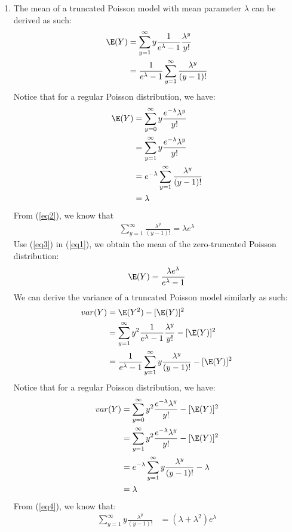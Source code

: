 \begin{enumerate}
\item
The mean of a truncated Poisson model with mean parameter $\lambda$ can be derived as such:
\begin{align}
\E(Y) & = \sum_{y = 1}^{\infty} y\frac{1}{e^\lambda - 1}\frac{\lambda^y}{y!} \nonumber \\
& = \frac{1}{e^\lambda - 1}\sum_{y = 1}^{\infty}\frac{\lambda^y}{(y-1)!} \label{eq1}
\end{align}
Notice that for a regular Poisson distribution, we have:
\begin{align}
\E(Y) & = \sum_{y = 0}^{\infty} y\frac{e^{-\lambda}\lambda^y}{y!} \nonumber \\
& = \sum_{y = 1}^{\infty} y\frac{e^{-\lambda}\lambda^y}{y!} \nonumber \\
& = e^{-\lambda}\sum_{y = 1}^{\infty}\frac{\lambda^y}{(y-1)!} \label{eq2} \\
& = \lambda \nonumber
\end{align}
From (\ref{eq2}), we know that
\begin{align}
\sum_{y = 1}^{\infty}\frac{\lambda^y}{(y-1)!} = \lambda e^{\lambda} \label{eq3}
\end{align}
Use (\ref{eq3}) in (\ref{eq1}), we obtain the mean of the zero-truncated Poisson distribution:
\[
\E(Y) = \frac{\lambda e^{\lambda}}{e^\lambda - 1}
\]
We can derive the variance of a truncated Poisson model similarly as such:
\begin{align}
var(Y) & = \E(Y^2) - [\E(Y)]^2 \nonumber \\
& = \sum_{y = 1}^{\infty} y^2\frac{1}{e^\lambda - 1}\frac{\lambda^y}{y!} - [\E(Y)]^2 \nonumber \\
& = \frac{1}{e^\lambda - 1}\sum_{y = 1}^{\infty}y\frac{\lambda^y}{(y-1)!} - [\E(Y)]^2 \nonumber
\end{align}
Notice that for a regular Poisson distribution, we have:
\begin{align}
var(Y) & = \sum_{y = 0}^{\infty} y^2 \frac{e^{-\lambda}\lambda^y}{y!} - [\E(Y)]^2 \nonumber \\
& = \sum_{y = 1}^{\infty} y^2 \frac{e^{-\lambda}\lambda^y}{y!} - [\E(Y)]^2 \nonumber \\
& = e^{-\lambda}\sum_{y = 1}^{\infty} y\frac{\lambda^y}{(y-1)!} - \lambda \label{eq4} \\
& = \lambda \nonumber
\end{align}
From (\ref{eq4}), we know that:
\begin{align}
\sum_{y = 1}^{\infty} y\frac{\lambda^y}{(y-1)!} & = (\lambda + \lambda^2)e^\lambda \label{eq5}

\end{align}
\end{enumerate}

